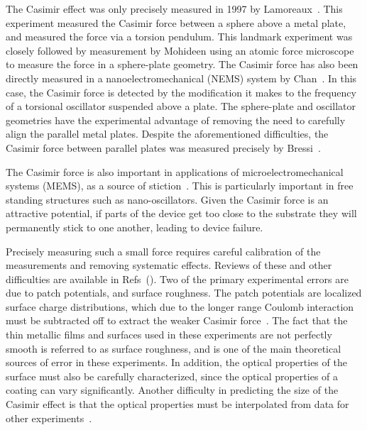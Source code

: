 The Casimir effect was only precisely measured in 1997 by Lamoreaux~\cite{Lamoreaux1997}.   
This experiment measured the Casimir force between a sphere above a metal plate,
and measured the force via a torsion pendulum.  
This landmark experiment was closely followed by measurement by Mohideen\etal\cite{Mohideen1998}
using an atomic force microscope to measure the force in a sphere-plate geometry.  
The Casimir force has also been directly measured in a nanoelectromechanical (NEMS) system 
by Chan\etal~\cite{Chan2001}.  In this case, the Casimir force is detected by the modification it
makes to the frequency of a torsional oscillator suspended above a plate.  
The sphere-plate and oscillator geometries have the experimental advantage of removing the need to carefully
align the parallel metal plates. %
Despite the aforementioned difficulties, the Casimir force between parallel plates was measured precisely by Bressi\etal~\cite{Bressi2002}.  

The Casimir force is also important in applications of microelectromechanical systems (MEMS), 
as a source of stiction~\cite{Tas1996, Serry1998, Buks2001}.  This is particularly important
in free standing structures such as nano-oscillators.  %
Given the Casimir force is an attractive potential, if parts of the device get too close to the substrate
they will permanently stick to one another, leading to device failure.  

Precisely measuring such a small force requires careful calibration of the measurements 
and removing systematic effects.  Reviews of these and other difficulties are available in Refs~(\cite{Lamoreaux2011, vanZwol2011, Bordag2009}).
Two of the primary experimental errors are due to 
patch potentials, and surface roughness.  The patch potentials are localized surface 
charge distributions, which due to the longer range Coulomb interaction must be subtracted off to extract the weaker
Casimir force~\cite{Sushkov2011}.  The fact that the thin metallic films and surfaces used in these 
experiments are not perfectly smooth is referred to as surface roughness, and is one of 
the main theoretical sources of error in these experiments.  
In addition, the optical properties of the surface must also be carefully characterized, since the 
optical properties of a coating can vary significantly.  Another difficulty in predicting the size of the 
Casimir effect is that the optical properties must be interpolated from data for other experiments~\cite{vanZwol2011}.

